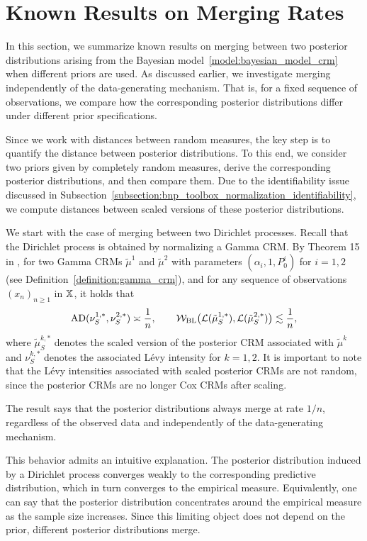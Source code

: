 \section{Known Results on Merging Rates}\label{section:merging_known_results}


In this section, we summarize known results on merging between two posterior distributions arising from the Bayesian model~\ref{model:bayesian_model_crm} when different priors are used. As discussed earlier, we investigate merging independently of the data-generating mechanism. That is, for a fixed sequence of observations, we compare how the corresponding posterior distributions differ under different prior specifications.

Since we work with distances between random measures, the key step is to quantify the distance between posterior distributions. To this end, we consider two priors given by completely random measures, derive the corresponding posterior distributions, and then compare them. Due to the identifiability issue discussed in Subsection~\ref{subsection:bnp_toolbox_normalization_identifiability}, we compute distances between scaled versions of these posterior distributions.

We start with the case of merging between two Dirichlet processes. Recall that the Dirichlet process is obtained by normalizing a Gamma CRM. By Theorem 15 in \cite{catalano2026merging}, for two Gamma CRMs $\tilde{\mu}^1$ and $\tilde{\mu}^2$ with parameters $(\alpha_i, 1,  P_0^i)$ for  $i=1,2$ (see Definition~\ref{definition:gamma_crm}), and for any sequence of observations $(x_n)_{n \geq 1}$ in $\mathbb{X}$, it holds that
\[
\mathrm{AD}(\nu_S^{1,*}, \nu_S^{2,*}) \asymp \frac{1}{n}, 
\qquad
\mathcal{W}_{\mathrm{BL}}\bigl(\mathcal{L}(\tilde{\mu}_S^{1,*}), \mathcal{L}(\tilde{\mu}_S^{2,*})\bigr) \lesssim \frac{1}{n},
\]
where $\tilde{\mu}_S^{k,*}$ denotes the scaled version of the posterior CRM associated with $\tilde{\mu}^k$ and $\nu_S^{k,*}$ denotes the associated L\'evy intensity for $k = 1,2$. It is important to note that the L\'evy intensities associated with scaled posterior CRMs are not random, since the posterior CRMs are no longer Cox CRMs after scaling.

The result says that the posterior distributions always merge at rate $1/n$, regardless of the observed data and independently of the data-generating mechanism.

This behavior admits an intuitive explanation. The posterior distribution induced by a Dirichlet process converges weakly to the corresponding predictive distribution, which in turn converges to the empirical measure. Equivalently, one can say that the posterior distribution concentrates around the empirical measure as the sample size increases. Since this limiting object does not depend on the prior, different posterior distributions merge.

